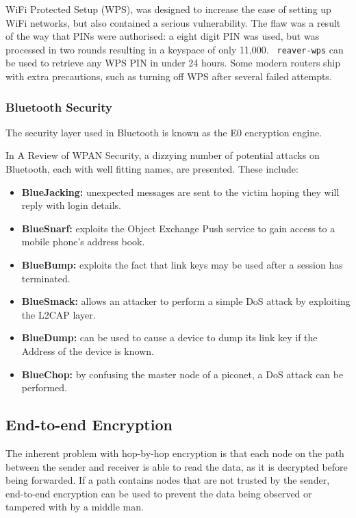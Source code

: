 \documentclass[10pt,journal,compsoc]{IEEEtran}
\begin{document}
WiFi Protected Setup (WPS), was designed to increase the ease of setting up
WiFi networks, but also contained a serious vulnerability.  The flaw was a
result of the way that PINs were authorised: a eight digit PIN was used, but
was processed in two rounds resulting in a keyspace of only 11,000. {\tt
reaver-wps} can be used to retrieve any WPS PIN in under 24 hours. Some modern
routers ship with extra precautions, such as turning off WPS after several
failed attempts. 

\subsubsection{Bluetooth Security}
The security layer used in Bluetooth is known as the E0 encryption engine. 

In A Review of WPAN Security\cite{Kennedy2008}, a dizzying number of potential
attacks on Bluetooth, each with well fitting names, are presented. These include: 
\begin{itemize}[$\bullet$]
\item {\bf BlueJacking:} unexpected messages are sent to the victim hoping they
will reply with login details. 
\item {\bf BlueSnarf:} exploits the Object Exchange Push service to gain
access to a mobile phone's address book. 
\item {\bf BlueBump:} exploits the fact that link keys may be used after a session
has terminated. 
\item {\bf BlueSmack:} allows an attacker to perform a simple DoS attack by
exploiting the L2CAP layer.
\item {\bf BlueDump:} can be used to cause a device to dump its link key if the
 Address of the device is known. 
\item {\bf BlueChop:} by confusing the master node of a piconet, a DoS attack can be
performed. 
\end{itemize}

\subsection{End-to-end Encryption}
The inherent problem with hop-by-hop encryption is that each node on the path
between the sender and receiver is able to read the data, as it is decrypted
before being forwarded.   If a path contains nodes that are not trusted by the
sender, end-to-end encryption can be used to prevent the data being observed or
tampered with by a middle man. 
\end{document}
